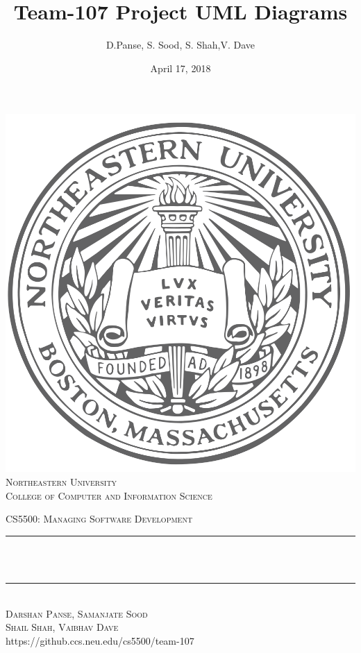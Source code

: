 \documentclass[12pt]{article}
\title{Team-107 Project UML Diagrams}
\author{D.Panse, S. Sood, S. Shah,V. Dave}
\date{April 17, 2018}
\makeatletter
\let\thetitle\@title
\let\thedate\@date
\def\thecourse{CS5500: Managing Software Development}
\def\theuniversity{Northeastern University}
\def\thecollege{College of Computer and Information Science}
\def\thegithuburl{https://github.ccs.neu.edu/cs5500/team-107}
\makeatother
\begin{document}

\begin{titlepage}
	\centering
    \includegraphics[scale = 0.20]{seal.png}\\[0.2cm]	
    \textsc{\LARGE \color{huskyred} \theuniversity\\[0.5mm]}	
	\textsc{\small \thecollege \\[1.5 cm]}	
    
    \textsc{\Large \thecourse }\\[0.5 cm]
    
	\rule{\linewidth}{0.2 mm} \\[0.4 cm]
	{ \huge \bfseries \thetitle}\\
	\rule{\linewidth}{0.2 mm} \\[1.5 cm]
	
	\textsc{\LARGE Darshan Panse, Samanjate Sood}\\[0.5 mm]
    \textsc{\LARGE Shail Shah, Vaibhav Dave}\\[0.5 mm]
    \thegithuburl\\[1.5 cm]
    \textsc{\LARGE \thedate}\\[2.0 cm]  
    
\end{titlepage}
\end{document}

